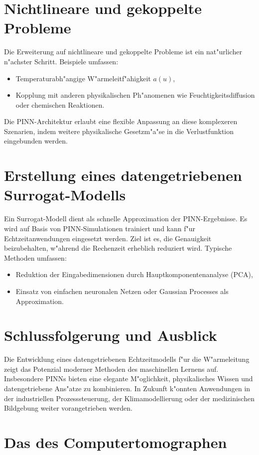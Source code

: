 \section{Nichtlineare und gekoppelte Probleme}
Die Erweiterung auf nichtlineare und gekoppelte Probleme ist ein nat"urlicher n"achster Schritt. Beispiele umfassen:
\begin{itemize}
	\item Temperaturabh"angige W"armeleitf"ahigkeit $a(u)$,
	\item Kopplung mit anderen physikalischen Ph"anomenen wie Feuchtigkeitsdiffusion oder chemischen Reaktionen.
\end{itemize}
Die PINN-Architektur erlaubt eine flexible Anpassung an diese komplexeren Szenarien, indem weitere physikalische Gesetzm"a"se in die Verlustfunktion eingebunden werden.

\section*{Erstellung eines datengetriebenen Surrogat-Modells}
Ein Surrogat-Modell dient als schnelle Approximation der PINN-Ergebnisse. Es wird auf Basis von PINN-Simulationen trainiert und kann f"ur Echtzeitanwendungen eingesetzt werden. Ziel ist es, die Genauigkeit beizubehalten, w"ahrend die Rechenzeit erheblich reduziert wird. Typische Methoden umfassen:
\begin{itemize}
	\item Reduktion der Eingabedimensionen durch Hauptkomponentenanalyse (PCA),
	\item Einsatz von einfachen neuronalen Netzen oder Gaussian Processes als Approximation.
\end{itemize}

\section*{Schlussfolgerung und Ausblick}
Die Entwicklung eines datengetriebenen Echtzeitmodells f"ur die W"armeleitung zeigt das Potenzial moderner Methoden des maschinellen Lernens auf. Insbesondere PINNs bieten eine elegante M"oglichkeit, physikalisches Wissen und datengetriebene Ans"atze zu kombinieren. In Zukunft k"onnten Anwendungen in der industriellen Prozesssteuerung, der Klimamodellierung oder der medizinischen Bildgebung weiter vorangetrieben werden.



\section{Das des Computertomographen}
\label{cha:1.1}

